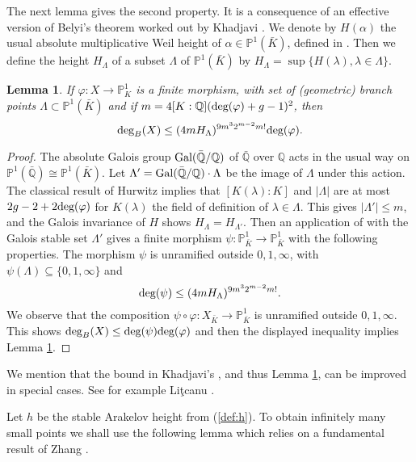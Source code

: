 \documentclass[11pt]{article}
\newtheorem{lemma}[theorem]{Lemma}
\numberwithin{equation}{section}
\def\deg{\textnormal{deg}}
\newcommand {\QQ}  {{\mathbb Q}}
\newcommand {\br} {\lambda}
\newcommand {\Br} {\Lambda}
\newcommand {\uu} {m}
\begin{document}
The next lemma gives the second property. It is a consequence of an effective version  of Belyi's theorem \cite{belyi:theorem} worked out by Khadjavi  \cite{khadjavi:belyi}. We denote by $H(\alpha)$  the usual absolute multiplicative Weil height of $\alpha\in \mathbb P^1(\bar{K})$, defined in \cite[1.5.4]{bogu:diophantinegeometry}. Then we define the height $H_\Lambda$ of a subset $\Br$ of $\mathbb P^1(\bar{K})$ by 
$H_\Br=\sup\{H(\br),\br\in\Br\}$.  
\begin{lemma}\label{lem:belyi}
If $\varphi:X\to \mathbb P^1_K$ is a finite morphism, with set of (geometric) branch points $\Br\subset \mathbb P^1(\bar{K})$ and if $\uu=4[K:\QQ](\deg (\varphi)+g-1)^2$, then 
$$\deg_{B}(X) \leq (4\uu H_\Br)^{9\uu^3 2^{\uu-2}\uu!}\deg(\varphi).$$
\end{lemma}
\begin{proof} 
The absolute Galois group $\textnormal{Gal}(\bar{\QQ}/\QQ)$ of $\bar{\QQ}$ over $\QQ$ acts in the usual way on $\mathbb P^1(\bar{\QQ})\cong\mathbb P^1(\bar{K})$. Let $\Br'=\textnormal{Gal}(\bar{\QQ}/\QQ)\cdot \Br$ be the image of $\Br$ under this action. The classical result of Hurwitz \cite[Theorem 7.4.16]{liu:ag} implies that  $[K(\br):K]$ and $\lvert \Br\rvert$ are at most $2g-2+2\deg(\varphi)$ for $K(\lambda)$  the field of definition of $\br\in \Br$. This gives  $\lvert\Br'\rvert\leq \uu$, and the Galois invariance \cite[1.5.17]{bogu:diophantinegeometry} of $H$ shows  $H_\Br=H_{\Br'}$.
Then an application of \cite[Theorem 1.1]{khadjavi:belyi} with the Galois stable set $\Br'$ gives a finite morphism $\psi:\mathbb P^1_{\bar{K}}\to \mathbb P^1_{\bar{K}}$ with the following properties. The morphism $\psi$ is unramified outside $0,1,\infty$, with
$\psi(\Br)\subseteq \{0,1,\infty\}$ and
$$\deg(\psi)\leq (4\uu H_\Br)^{9\uu^3 2^{\uu-2}\uu !}.$$
We observe that the composition $\psi\circ\varphi: X_{\bar{K}}\to \mathbb P^1_{\bar{K}}$ is unramified outside $0,1,\infty$. This shows  $\deg_B(X)\leq \deg(\psi)\deg(\varphi)$ and then the displayed inequality implies Lemma \ref{lem:belyi}. 
\end{proof}



We mention that the bound in Khadjavi's \cite[Theorem 1.1]{khadjavi:belyi}, and thus Lemma \ref{lem:belyi}, can be improved in special cases. See for example Li{\c{t}}canu \cite{litcanu:belyi}.


Let $h$ be the stable Arakelov height from (\ref{def:h}). To obtain infinitely many small points we shall use the following lemma which relies on a fundamental result of Zhang \cite{zhang:positive}. 
\end{document}
